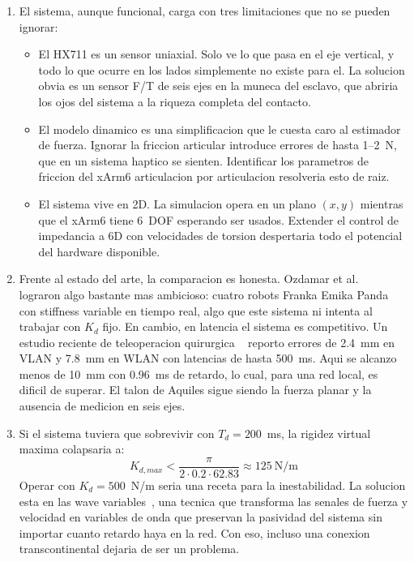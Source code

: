 \documentclass[journal,10pt,twoside]{IEEEtran}
\begin{document}
\begin{enumerate}[label=(\alph*)]

\item El sistema, aunque funcional, carga con tres limitaciones que
no se pueden ignorar:

\begin{itemize}
    \item El HX711 es un sensor uniaxial. Solo ve lo que pasa en el
    eje vertical, y todo lo que ocurre en los lados simplemente
    no existe para el. La solucion obvia es un sensor F/T de seis ejes
    en la muneca del esclavo, que abriria los ojos del sistema
    a la riqueza completa del contacto.

    \item El modelo dinamico es una simplificacion que le cuesta caro
    al estimador de fuerza. Ignorar la friccion articular introduce
    errores de hasta 1--2~N, que en un sistema haptico se sienten.
    Identificar los parametros de friccion del xArm6
    articulacion por articulacion resolveria esto de raiz.

    \item El sistema vive en 2D. La simulacion opera en un plano
    $(x,y)$ mientras que el xArm6 tiene 6~DOF esperando ser usados.
    Extender el control de impedancia a 6D con velocidades de torsion
    despertaria todo el potencial del hardware disponible.
\end{itemize}

\item Frente al estado del arte, la comparacion es honesta.
Ozdamar et al.~\cite{ozdamar2022} lograron algo bastante mas ambicioso:
cuatro robots Franka Emika Panda con stiffness variable en tiempo real,
algo que este sistema ni intenta al trabajar con $K_d$ fijo.
En cambio, en latencia el sistema es competitivo. Un estudio reciente
de teleoperacion quirurgica ~\cite{surgical2023} reporto errores de 2.4~mm en VLAN y
7.8~mm en WLAN con latencias de hasta 500~ms. Aqui se alcanzo menos
de 10~mm con 0.96~ms de retardo, lo cual, para una red local, es
dificil de superar. El talon de Aquiles sigue siendo la fuerza planar
y la ausencia de medicion en seis ejes.

\item Si el sistema tuviera que sobrevivir con $T_d = 200$~ms,
la rigidez virtual maxima colapsaria a:
\[
K_{d,max} < \frac{\pi}{2 \cdot 0.2 \cdot 62.83} \approx 125\ \text{N/m}
\]
Operar con $K_d = 500$~N/m seria una receta para la inestabilidad.
La solucion esta en las wave variables~\cite{niemeyer2008}, una tecnica
que transforma las senales de fuerza y velocidad en variables de onda
que preservan la pasividad del sistema sin importar cuanto retardo
haya en la red. Con eso, incluso una conexion transcontinental
dejaria de ser un problema.


\end{enumerate}
\end{document}
